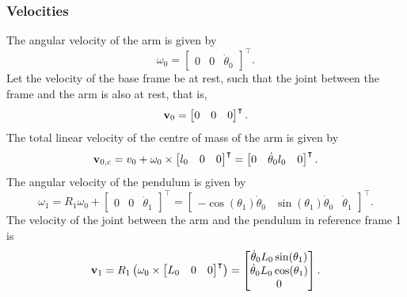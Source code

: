 \subsubsection{Velocities}
The angular velocity of the arm is given by
\begin{equation}
	\omega_0 = 	\begin{bmatrix}
					0 & 0 & \dot{\theta}_0
				\end{bmatrix}^\intercal.
\end{equation}
Let the velocity of the base frame be at rest, such that the joint
between the frame and the arm is also at rest, that is,
\begin{equation}
	\text{\textbf{v}}_0 = 	\begin{bmatrix}
					0 & 0 & 0
			\end{bmatrix}^\intercal.
\end{equation}
The total linear velocity of the centre of mass of the arm is
given by
\begin{equation}
	\text{\textbf{v}}_{0, \text{c}} = v_0+\omega_0\times\begin{bmatrix}
					l_0 & 0 & 0
				\end{bmatrix}^\intercal = \begin{bmatrix}
				0 & \dot{\theta}_0l_0 & 0
				\end{bmatrix}^\intercal.
\end{equation}
The angular velocity of the pendulum is given by
\begin{equation}
\omega_1 = R_1\omega_0 + \begin{bmatrix}
				0 & 0 & \dot{\theta}_1
			\end{bmatrix}^\intercal = 
			\begin{bmatrix}
				-\cos(\theta_1)\dot{\theta}_0 & \sin(\theta_1)\dot{\theta}_0 & \dot{\theta}_1
			\end{bmatrix}^\intercal.
\end{equation}
The velocity of the joint between the arm and the pendulum in
reference frame 1 is
\begin{equation}
	\text{\textbf{v}}_{1} = R_1\left( \omega_0\times	\begin{bmatrix}
									L_0 & 0 & 0
									\end{bmatrix}^\intercal \right) = 
	\begin{bmatrix}
		\dot{\theta}_0L_0\sin(\theta_1)\\
		\dot{\theta}_0L_0\cos(\theta_1)\\
		0
	\end{bmatrix}.
\end{equation}
